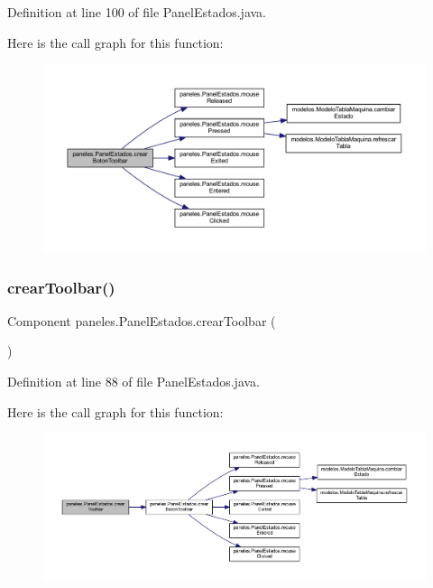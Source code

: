 Definition at line 100 of file Panel\+Estados.\+java.

Here is the call graph for this function\+:\nopagebreak
\begin{figure}[H]
\begin{center}
\leavevmode
\includegraphics[width=350pt]{classpaneles_1_1_panel_estados_af627b3edddac65046fd93dc774904597_cgraph}
\end{center}
\end{figure}
\mbox{\label{classpaneles_1_1_panel_estados_ae62e5c6656177ec67c97cc2fe48d1e54}} 
\subsubsection{\texorpdfstring{crear\+Toolbar()}{crearToolbar()}}
{\footnotesize\ttfamily Component paneles.\+Panel\+Estados.\+crear\+Toolbar (\begin{DoxyParamCaption}{ }\end{DoxyParamCaption})}



Definition at line 88 of file Panel\+Estados.\+java.

Here is the call graph for this function\+:\nopagebreak
\begin{figure}[H]
\begin{center}
\leavevmode
\includegraphics[width=350pt]{classpaneles_1_1_panel_estados_ae62e5c6656177ec67c97cc2fe48d1e54_cgraph}
\end{center}
\end{figure}
\mbox{\label{classpaneles_1_1_panel_estados_a8f949a32d4a35371a2f2b37a66ede21c}} 
